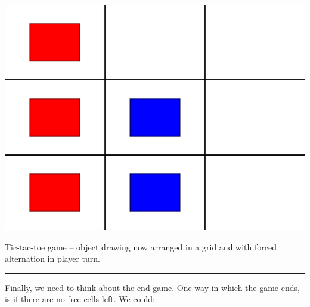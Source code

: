 \documentclass{tufte-book} %
\begin{document}
\begin{marginfigure}[0.0in]
\includegraphics[width=\linewidth]{ch6-game5.eps}
\caption{Tic-tac-toe game -- object drawing now arranged in a grid and with forced alternation in player turn.}
\label{fig:ch6-game5}
\end{marginfigure}

\vspace{1mm}
\noindent\rule{4cm}{0.5pt}
\vspace{2mm}

\noindent Finally,  we need to think about the end-game. One way in which the game ends, is if there are no free cells left. We could:
\end{document}
